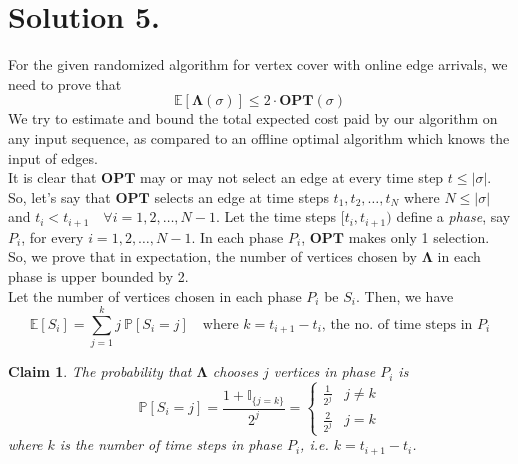 \documentclass[11pt]{article}
\newtheorem{claim}{Claim}
\begin{document}
\section*{Solution 5.}
For the given randomized algorithm for vertex cover with online edge arrivals, we
need to prove that
\begin{equation}
    \mathbb{E}[\mathbf{\Lambda}(\sigma)] \leq 2 \cdot \mathbf{OPT}(\sigma)
\end{equation}
We try to estimate and bound the total expected cost paid by our algorithm on any input
sequence, as compared to an offline optimal algorithm which knows the input of edges. \\
It is clear that $\mathbf{OPT}$ may or may not select an edge at every time step $t \leq |\sigma|$.
So, let's say that $\mathbf{OPT}$ selects an edge at time steps $t_{1}, t_{2}, \ldots, t_{N}$
where $N \leq |\sigma|$ and $t_{i} < t_{i+1} \quad \forall i = 1, 2, \ldots, N-1$. Let the time
steps $[t_{i}, t_{i+1})$ define a \textit{phase}, say $P_{i}$, for every $i = 1, 2, \ldots, N-1$.
In each phase $P_{i}$, $\mathbf{OPT}$ makes only 1 selection. So, we prove that in expectation, the
number of vertices chosen by $\mathbf{\Lambda}$ in each phase is upper bounded by 2. \\
Let the number of vertices chosen in each phase $P_{i}$ be $S_{i}$. Then, we have
\begin{equation}
    \mathbb{E}[S_{i}] = \sum_{j=1}^{k} j \ \mathbb{P}[S_{i} = j]
    \quad \text{where } k = t_{i+1} - t_{i} \text{, the no. of time steps in } P_{i}
\end{equation}
\begin{claim}
    The probability that $\mathbf{\Lambda}$ chooses $j$ vertices in phase $P_{i}$ is
    \begin{equation}
        \mathbb{P}[S_{i} = j] = \frac{1 + \mathbb{I}_{\{j = k\}}}{2^{j}} = \begin{cases}
            \frac{1}{2^{j}} & j \neq k \\[5pt]
            \frac{2}{2^{j}} & j = k
        \end{cases}
    \end{equation}
    where $k$ is the number of time steps in phase $P_{i}$, i.e. $k = t_{i+1} - t_{i} $.
\end{claim}
\end{document}
